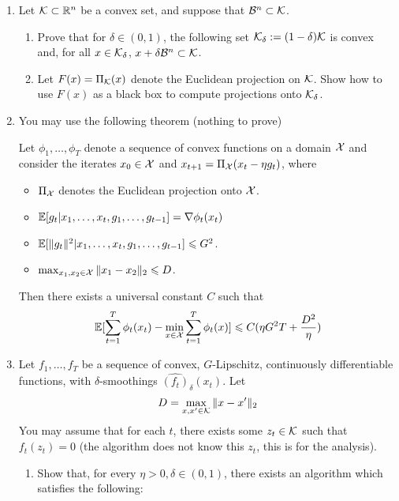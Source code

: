 \documentclass[12pt]{article}
\begin{document}
\begin{enumerate}
\begin{enumerate}
		\end{enumerate}
		\item Let ${\cal K} \subset \mathbb{R}^n$ be a convex set, and suppose that ${\cal B}^{n} \subset {\cal K}$. 
		\begin{enumerate}
			\item Prove that for $\delta \in (0,1)$, the following set ${\cal K}_{\delta} := (1-\delta){\cal K}$ is convex and, for all $x \in {\cal K}_{\delta}$, $x + \delta {\cal B}^{n} \subset {\cal K}$. 
			\item Let $F(x) = \Pi_{{\cal K}}(x)$ denote the Euclidean projection on ${\cal K}$. Show how to use $F(x)$ as a black box to compute projections onto ${\cal K}_{\delta}$.
		\end{enumerate}
		\item You may use the following theorem (nothing to prove)
		\begin{theorem}\label{thm:online} Let $\phi_1,\dots,\phi_T$ denote a sequence of convex functions on a domain ${\cal X}$ and consider the iterates $x_0 \in {\cal X}$ and $x_{t+1} = \Pi_{{\cal X}} (x_t - \eta g_{t})$, where 
		\begin{itemize}
			\item $\Pi_{{\cal X}}$ denotes the Euclidean projection onto ${\cal X}$.
			\item $\mathbb{E}[ g_{t} | x_1,\dots,x_t,g_1,\dots,g_{t-1}] = \nabla \phi_t(x_t)$
			\item $\mathbb{E}[ \|g_{t}\|^2 | x_1,\dots,x_t,g_1,\dots,g_{t-1}] \leqslant G^2$. 
			\item $\max_{x_1,x_2 \in {\cal X}}\|x_1 - x_2\|_2 \leqslant D$. 
		\end{itemize}
		Then there exists a universal constant $C$ such that
		\begin{eqnarray}
			\mathbb{E}[\sum_{t=1}^T \phi_t(x_t) - \min_{x \in {\cal X}}\sum_{t=1}^T \phi_t(x)] \leqslant C(\eta G^2 T + \frac{D^2}{\eta})
		\end{eqnarray}
		\end{theorem}
		\item Let $f_{1},\dots,f_{T}$ be a sequence of convex, $G$-Lipschitz, continuously differentiable functions, with $\delta$-smoothings $\widehat{(f_t)}_{\delta}(x_t)$. Let
		\begin{eqnarray}
		D = \max_{x,x' \in {\cal K}} \|x - x'\|_2
		\end{eqnarray}
		You may assume that for each $t$, there exists some $z_t \in {\cal K}$ such that $f_t(z_t) = 0$ (the algorithm does not know this $z_t$, this is for the analysis).
		\begin{enumerate}
			\item Show that, for every $\eta > 0 , \delta \in (0,1)$, there exists an algorithm which satisfies the following:

\end{enumerate}
\end{enumerate}
\end{document}
